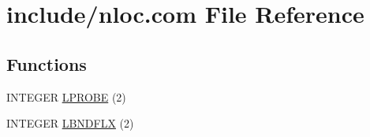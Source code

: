 \hypertarget{home_2abonfi_2_c_f_d__codes_2_eul_f_s_83_84_2include_2nloc_8com}{\section{include/nloc.com File Reference}
\label{home_2abonfi_2_c_f_d__codes_2_eul_f_s_83_84_2include_2nloc_8com}
}
\subsection*{Functions}
\begin{DoxyCompactItemize}
\item 
I\-N\-T\-E\-G\-E\-R \hyperlink{home_2abonfi_2_c_f_d__codes_2_eul_f_s_83_84_2include_2nloc_8com_ade8755dc46f6ab90e43b675468447a6a}{L\-P\-R\-O\-B\-E} (2)
\item 
I\-N\-T\-E\-G\-E\-R \hyperlink{home_2abonfi_2_c_f_d__codes_2_eul_f_s_83_84_2include_2nloc_8com_a7878a6929dd0bb737d94892ae3d464be}{L\-B\-N\-D\-F\-L\-X} (2)
\end{DoxyCompactItemize}
